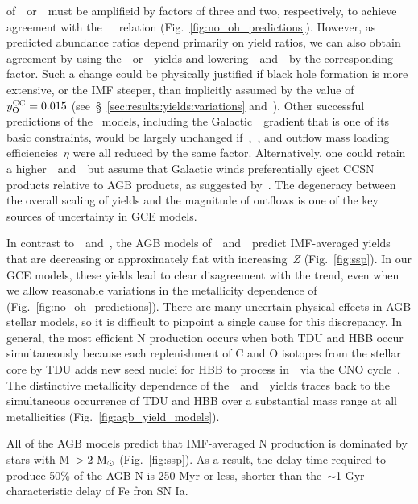 \documentclass[ms.tex]{subfiles}
\begin{document}
of~\cristallo~or~\ventura~must be amplifieid by factors of three and two,
respectively, to achieve agreement with the~\citet{Dopita2016}~\ohno~relation
(Fig.~\ref{fig:no_oh_predictions}).
However, as predicted abundance ratios depend primarily on yield ratios, we can
also obtain agreement by using the~\cristallo~or~\ventura~yields and
lowering~~and~~by the corresponding factor.
Such a change could be physically justified if black hole formation is more
extensive, or the IMF steeper, than implicitly assumed by the value
of~$y_\text{O}^\text{CC} = 0.015$ (see~\S~\ref{sec:results:yields:variations}
and~\citealp{Griffith2021a}).
Other successful predictions of the~\citet{Johnson2021} models, including the
Galactic~\oh~gradient that is one of its basic constraints, would be largely
unchanged if~,~, and outflow mass loading efficiencies~$\eta$
were all reduced by the same factor.
Alternatively, one could retain a higher~~and~~but assume that
Galactic winds preferentially eject CCSN products relative to AGB products, as
suggested by~\citet{Vincenzo2016a}.
The degeneracy between the overall scaling of yields and the magnitude of
outflows is one of the key sources of uncertainty in GCE models.
\par
In contrast to~\cristallo~and~\ventura, the AGB models
of~\karakasten~and~\karakas~predict IMF-averaged yields that are decreasing or
approximately flat with increasing~$Z$ (Fig.~\ref{fig:ssp}).
In our GCE models, these yields lead to clear disagreement with the
\citet{Dopita2016} trend, even when we allow reasonable variations in the
metallicity dependence of~ (Fig.~\ref{fig:no_oh_predictions}).
There are many uncertain physical effects in AGB stellar models, so it is
difficult to pinpoint a single cause for this discrepancy.
In general, the most efficient N production occurs when both TDU and HBB occur
simultaneously because each replenishment of C and O isotopes from the stellar
core by TDU adds new seed nuclei for HBB to process in~\Nfourteen~via the CNO
cycle~\citep{Ventura2013}.
The distinctive metallicity dependence of the~\karakasten~and~\karakas~yields
traces back to the simultaneous occurrence of TDU and HBB over a substantial
mass range at all metallicities (Fig.~\ref{fig:agb_yield_models}).
\par
All of the AGB models predict that IMF-averaged N production is dominated by
stars with M~$> 2~\text{M}_\odot$ (Fig.~\ref{fig:ssp}).
As a result, the delay time required to produce 50\% of the AGB N is 250 Myr or
less, shorter than the~$\sim$1 Gyr characteristic delay of Fe fron SN Ia.
\end{document}
